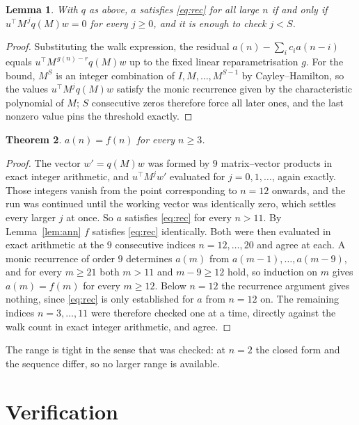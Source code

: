 \documentclass[11pt,a4paper]{article}
\theoremstyle{plain}
\newtheorem{theorem}{Theorem}
\newtheorem{lemma}[theorem]{Lemma}
\theoremstyle{definition}
\begin{document}
\begin{lemma}\label{lem:crit}
With $q$ as above, $a$ satisfies \eqref{eq:rec} for all large $n$ if and only if
$u^{\!\top}M^{\,j}q(M)w=0$ for every $j\ge0$, and it is enough to check $j<S$.
\end{lemma}

\begin{proof}
Substituting the walk expression, the residual $a(n)-\sum_ic_ia(n-i)$ equals
$u^{\!\top}M^{\,g(n)-r}q(M)w$ up to the fixed linear reparametrisation $g$. For the bound,
$M^{S}$ is an integer combination of $I,M,\dots,M^{S-1}$ by Cayley--Hamilton, so the values
$u^{\!\top}M^{j}q(M)w$ satisfy the monic recurrence given by the characteristic polynomial of
$M$; $S$ consecutive zeros therefore force all later ones, and the last nonzero value pins the
threshold exactly.
\end{proof}

\begin{theorem}
$a(n)=f(n)$ for every $n\ge3$.
\end{theorem}

\begin{proof}
The vector $w'=q(M)w$ was formed by $9$ matrix--vector products in exact integer
arithmetic, and $u^{\!\top}M^{j}w'$ evaluated for $j=0,1,\dots$, again exactly. Those integers
vanish from the point corresponding to $n=12$ onwards, and the run was continued until the
working vector was identically zero, which settles every larger $j$ at once. So $a$ satisfies
\eqref{eq:rec} for every $n>11$. By Lemma~\ref{lem:ann} $f$ satisfies \eqref{eq:rec}
identically. Both were then evaluated in exact arithmetic at the $9$ consecutive indices
$n=12,\dots,20$ and agree at each. A monic recurrence of order $9$
determines $a(m)$ from $a(m-1),\dots,a(m-9)$, and for every $m\ge21$ both
$m>11$ and $m-9\ge12$ hold, so induction on $m$ gives $a(m)=f(m)$ for every
$m\ge12$.
Below $n=12$ the recurrence argument gives nothing, since \eqref{eq:rec} is only
established for $a$ from $n=12$ on. The remaining indices $n=3,\dots,11$ were
therefore checked one at a time, directly against the walk count in exact integer arithmetic,
and agree.
\end{proof}

The range is tight in the sense that was checked: at $n=2$ the closed form and the sequence differ, so no larger range is available.

\section{Verification}
\end{document}
